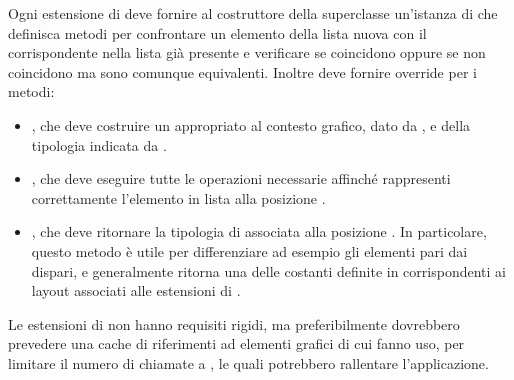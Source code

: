 \documentclass[../../manuale-manutentore.tex]{subfiles}
\begin{document}
Ogni estensione di  deve fornire al costruttore della superclasse un'istanza di \linebreak{} che definisca metodi per confrontare un elemento della lista nuova con il corrispondente nella lista già presente e verificare se coincidono oppure se non coincidono ma sono comunque equivalenti. Inoltre deve fornire override per i metodi:
\begin{itemize}
  \item{}, che deve costruire un  appropriato al contesto grafico, dato da , e della tipologia indicata da .
  \item{}, che deve eseguire tutte le operazioni necessarie affinché  rappresenti correttamente l'elemento in lista alla posizione .
  \item{}, che deve ritornare la tipologia di  associata alla posizione  . In particolare, questo metodo è utile per differenziare ad esempio gli elementi pari dai dispari, e generalmente ritorna una delle costanti definite in  corrispondenti ai layout associati alle estensioni di .
\end{itemize}

Le estensioni di  non hanno requisiti rigidi, ma preferibilmente dovrebbero prevedere una cache di riferimenti ad elementi grafici di cui fanno uso, per limitare il numero di chiamate a , le quali potrebbero rallentare l'applicazione.
\end{document}
